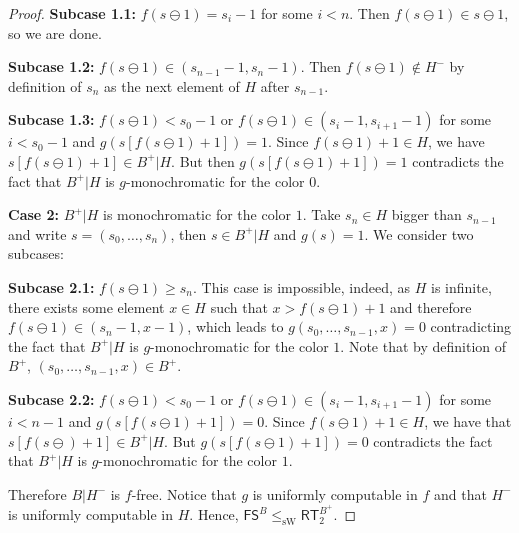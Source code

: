 \documentclass[10pt,a4paper]{amsart}
\newcommand\FS{\mathsf{FS}}
\newcommand\RT{\mathsf{RT}}
\newcommand\sW{\mathrm{sW}}
\begin{document}
\begin{proof}
\textbf{Subcase 1.1:} $f(s \ominus 1) = s_i - 1$ for some $i < n$. 
Then $f(s\ominus 1)\in s\ominus 1$, so we are done.

\textbf{Subcase 1.2:} $f(s \ominus 1) \in (s_{n - 1} - 1, s_{n} - 1)$. 
Then $f(s\ominus 1)\notin H^-$ by definition of $s_n$ as the next element of $H$ after $s_{n-1}$.

\textbf{Subcase 1.3:} $f(s \ominus 1) < s_0 - 1$ or  $f(s \ominus 1) \in (s_i - 1, s_{i+1} - 1)$ for some $i < s_0 - 1$ and $g(s[f(s \ominus 1)+1]) = 1$. 
Since $f(s\ominus 1)+1 \in H$, we have $s[f(s\ominus 1)+1] \in B^+\vert H$. But then 
$g(s[f(s \ominus 1)+1]) = 1$ contradicts the fact that $B^+\vert H$ is $g$-monochromatic for the color $0$. 

\textbf{Case 2:} $B^+\vert H$ is monochromatic for the color $1$. Take $s_n \in H$ bigger than $s_{n - 1}$ and write $s = (s_0, \dots, s_{n})$, then $s \in B^+\vert H$ and $g(s) = 1$. We consider two subcases:

\textbf{Subcase 2.1:} $f(s \ominus 1) \geq s_{n}$. This case is impossible, indeed, as $H$ is infinite, there exists some element $x \in H$ such that $x > f(s \ominus 1) + 1$ and therefore $f(s \ominus 1) \in (s_{n} - 1, x - 1)$, which leads to $g(s_0, \dots, s_{n - 1}, x) = 0$ contradicting the fact that $B^+\vert H$ is $g$-monochromatic for the color $1$. Note that by definition of $B^+$, $(s_0, \dots, s_{n - 1}, x)\in B^+$. 

\textbf{Subcase 2.2:} $f(s \ominus 1) < s_0 - 1$ or $f(s \ominus 1) \in (s_i - 1, s_{i+1} - 1)$ for some $i < n - 1$ and $g(s[f(s \ominus 1)+1]) = 0$.  
Since $f(s\ominus 1)+1 \in H$, we have that $s[f(s\ominus )+1] \in B^+\vert H$. But 
$g(s[f(s \ominus 1)+1]) = 0$ contradicts the fact that $B^+\vert H$ is $g$-monochromatic for the color $1$. 

Therefore $B\vert H^-$ is $f$-free.
Notice that $g$ is uniformly computable in $f$ and that $H^-$ is uniformly computable in $H$. Hence, $\FS^B \leq_{\sW} \RT^{B^+}_2$.
 \end{proof}
\end{document}
